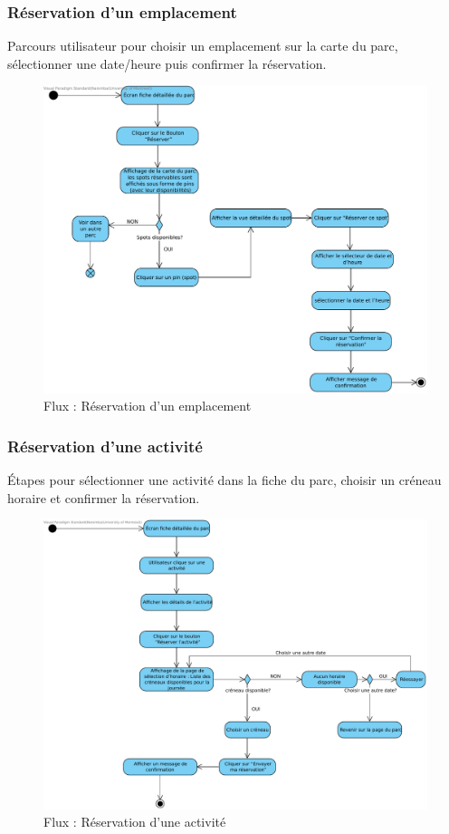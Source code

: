 \documentclass[12pt,a4paper]{article}
\begin{document}
\subsubsection{Réservation d'un emplacement}

Parcours utilisateur pour choisir un emplacement sur la carte du parc, sélectionner une date/heure puis confirmer la réservation.

\begin{figure}[h!]
  \centering
  \includegraphics[width=0.9\linewidth]{attachments/Reservation_d_un_emplacement.pdf}
  \caption{Flux : Réservation d'un emplacement}
\end{figure}

\subsubsection{Réservation d'une activité}

Étapes pour sélectionner une activité dans la fiche du parc, choisir un créneau horaire et confirmer la réservation.

\begin{figure}[h!]
  \centering
  \includegraphics[width=0.9\linewidth]{attachments/Reservation_Activite.pdf}
  \caption{Flux : Réservation d'une activité}
\end{figure}
\end{document}
